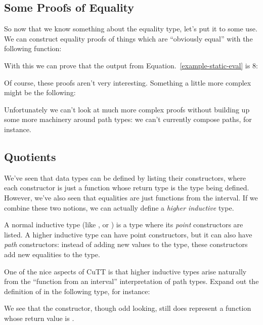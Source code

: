 \subsection{Some Proofs of Equality}
So now that we know something about the equality type, let's put it to some use.
We can construct equality proofs of things which are ``obviously equal'' with
the following function:
\begin{agdalisting}
\end{agdalisting}
With this we can prove that the output from Equation.~\ref{example-static-eval}
is 8:
\begin{agdalisting*}
\end{agdalisting*}

Of course, these proofs aren't very interesting.
Something a little more complex might be the following:
\begin{agdalisting*}
\end{agdalisting*}
Unfortunately we can't look at much more complex proofs without building up some
more machinery around path types: we can't currently compose paths, for
instance.
\subsection{Quotients}
We've seen that data types can be defined by listing their constructors, where
each constructor is just a function whose return type is the type being defined.
However, we've also seen that equalities are just functions from the interval.
If we combine these two notions, we can actually define a \emph{higher
  inductive} type.
\begin{definition}
  A normal inductive type (like , or \Nat) is a type
  where its \emph{point} constructors are listed.
  A higher inductive type can have point constructors, but it can also have
  \emph{path} constructors: instead of adding new values to the type, these
  constructors add new equalities to the type.
\end{definition}

One of the nice aspects of CuTT is that higher inductive types arise naturally
from the ``function from an interval'' interpretation of path types.
Expand out the definition of \AgdaFunction{\(\equiv\)} in the following type,
for instance:
\begin{agdalisting}
\end{agdalisting}
We see that the  constructor, though odd looking,
still does represent a function whose return value is
.

